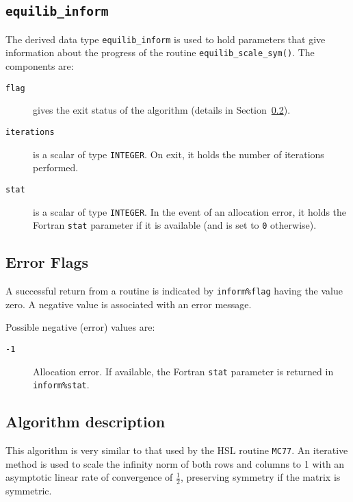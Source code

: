 \subsection{\texttt{equilib\_inform}} \label{type:equilib_inform}

The derived data type \texttt{equilib\_inform} is used to hold parameters that
give information about the progress of the routine
\texttt{equilib\_scale\_sym()}. The components are:

\begin{description}

\item[\texttt{flag}] gives the exit status of the algorithm (details in Section~\ref{returns:equilib}).

\item[\texttt{iterations}] is a scalar of type \texttt{INTEGER}. On exit, it
   holds the number of iterations performed.

\item[\texttt{stat}] is a scalar of type \texttt{INTEGER}. In the event of an allocation error, it holds the Fortran \texttt{stat} parameter if it is available (and is set to \texttt{0} otherwise).

\end{description}

\subsection{Error Flags} \label{returns:equilib}
A successful return from a routine is indicated by \texttt{inform\%flag} having the value zero. A negative value is associated with an error message.

Possible negative (error) values are:
\begin{description}
\item[\texttt{-1}] Allocation error. If available, the Fortran \texttt{stat} parameter is returned in \texttt{inform\%stat}.
\end{description}

\subsection{Algorithm description}

This algorithm is very similar to that used by the HSL routine \texttt{MC77}.
An iterative method
is used to scale the infinity norm of both rows and columns to 1 with an asymptotic linear rate of convergence of $\frac{1}{2}$, preserving symmetry if the matrix is symmetric.

